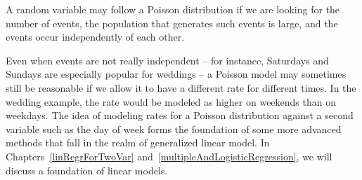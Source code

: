 A random variable may follow a Poisson distribution if we are looking for the number of events, the population that generates such events is large, and the events occur independently of each other.

Even when events are not really independent --
for instance, Saturdays and Sundays are especially
popular for weddings --
a Poisson model may sometimes still be reasonable
if we allow it to have a different rate for different
times.
In the wedding example, the rate would be modeled as
higher on weekends than on weekdays.
The idea of modeling rates for a Poisson distribution
against a second variable such as the day of week forms
the foundation of some more advanced methods that fall
in the realm of 
    {generalized linear model}.
In Chapters~\ref{linRegrForTwoVar}
and~\ref{multipleAndLogisticRegression},
we will discuss a foundation of linear models.



{}

